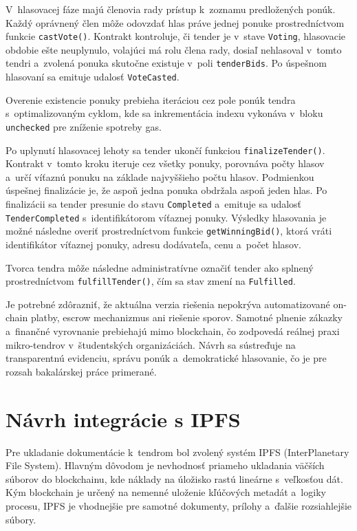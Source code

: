 V~hlasovacej fáze majú členovia rady prístup k~zoznamu predložených ponúk.
Každý oprávnený člen môže odovzdať hlas práve jednej ponuke prostredníctvom
funkcie \texttt{castVote()}. Kontrakt kontroluje, či tender je v~stave
\texttt{Voting}, hlasovacie obdobie ešte neuplynulo, volajúci má rolu člena
rady, dosiaľ nehlasoval v~tomto tendri a~zvolená ponuka skutočne existuje
v~poli \texttt{tenderBids}. Po úspešnom hlasovaní sa emituje udalosť
\texttt{VoteCasted}.

Overenie existencie ponuky prebieha iteráciou cez pole ponúk tendra
s~optimalizovaným cyklom, kde sa inkrementácia indexu vykonáva v~bloku
\texttt{unchecked} pre zníženie spotreby gas.

Po uplynutí hlasovacej lehoty sa tender ukončí funkciou
\texttt{finalizeTender()}. Kontrakt v~tomto kroku iteruje cez všetky ponuky,
porovnáva počty hlasov a~určí víťaznú ponuku na základe najvyššieho počtu
hlasov. Podmienkou úspešnej finalizácie je, že aspoň jedna ponuka obdržala
aspoň jeden hlas. Po finalizácii sa tender presunie do stavu
\texttt{Completed} a~emituje sa udalosť \texttt{TenderCompleted}
s~identifikátorom víťaznej ponuky. Výsledky hlasovania je možné následne
overiť prostredníctvom funkcie \texttt{getWinningBid()}, ktorá vráti
identifikátor víťaznej ponuky, adresu dodávateľa, cenu a~počet hlasov.

Tvorca tendra môže následne administratívne označiť tender ako splnený
prostredníctvom \texttt{fulfillTender()}, čím sa stav zmení na
\texttt{Fulfilled}.

Je potrebné zdôrazniť, že aktuálna verzia riešenia nepokrýva automatizované
on-chain platby, escrow mechanizmus ani riešenie sporov. Samotné plnenie
zákazky a~finančné vyrovnanie prebiehajú mimo blockchain, čo zodpovedá
reálnej praxi mikro-tendrov v~študentských organizáciách. Návrh sa sústreďuje
na transparentnú evidenciu, správu ponúk a~demokratické hlasovanie, čo je
pre rozsah bakalárskej práce primerané.

\section{Návrh integrácie s IPFS}
\label{sec:ipfs_design}

Pre ukladanie dokumentácie k~tendrom bol zvolený systém IPFS (InterPlanetary
File System). Hlavným dôvodom je nevhodnosť priameho ukladania väčších
súborov do blockchainu, kde náklady na úložisko rastú lineárne s~veľkosťou
dát. Kým blockchain je určený na nemenné uloženie kľúčových metadát
a~logiky procesu, IPFS je vhodnejšie pre samotné dokumenty, prílohy
a~ďalšie rozsiahlejšie súbory.

